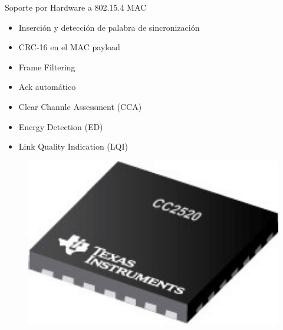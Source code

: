 \documentclass[aspectratio=169]{beamer}
\begin{document}
\begin{frame}{Soporte por Hardware a 802.15.4 MAC} 
\begin{minipage}[c]{1.0\linewidth}
	\begin{minipage}[c]{0.70\linewidth}
		\begin{itemize}
			\vspace{5px}
			\item Inserción y detección de palabra de sincronización	
			\vspace{5px}
			\item CRC-16 en el MAC payload
			\vspace{5px}
			\item Frame Filtering
			\vspace{5px}
			\item Ack automático
			\vspace{5px}
			\item Clear Channle Assessment (CCA)
			\vspace{5px}
			\item Energy Detection (ED)
			\vspace{5px}
			\item Link Quality Indication (LQI)
		\end{itemize}
	\end{minipage}
	\begin{minipage}[c]{0.25\linewidth}
		\begin{figure}[H]
			\includegraphics[width=1\textwidth]{./imagenes/cc2520.jpg}
		\end{figure}	  	  	
	\end{minipage}
\end{minipage}
\end{frame}
\end{document}
